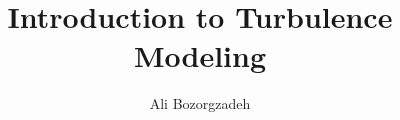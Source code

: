 \documentclass[11pt]{report}
\title{Introduction to Turbulence Modeling}
\author{Ali Bozorgzadeh}
\begin{document}
\maketitle
\tableofcontents
\listoffigures
\listoflistings

% 






% 
\end{document}
